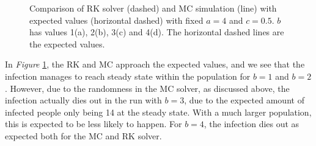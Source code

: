 \begin{figure}[!h]
    \caption{Comparison of RK solver (dashed) and MC simulation (line) with expected values (horizontal dashed) with fixed $a=4$ and $c=0.5$. 
    $b$ has values 1(a), 2(b), 3(c) and 4(d). The horizontal dashed lines are the expected values.}
    \label{fig:b}
\end{figure}
In \textit{Figure} \ref{fig:b}, the RK and MC approach the expected values, and we see that the infection manages to reach steady state within the population for $b=1$ and $b=2$.
However, due to the randomness in the MC solver, as discussed above, the infection actually dies out in the run with $b=3$, due to the expected amount of infected people only being 14 at the steady state.
With a much larger population, this is expected to be less likely to happen. For $b=4$, the infection dies out as expected both for the MC and RK solver.

